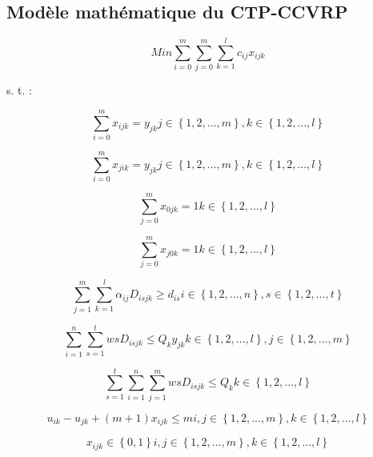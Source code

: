 \documentclass[12pt, a4paper, onecolumn, twoside,french,cleardoublepage=plain,openany]{article}
\begin{document}
\subsection{Modèle mathématique du CTP-CCVRP}\label{modele}
\begin{equation}
Min \sum_{i=0}^{m}\sum_{j=0}^{m}\sum_{k=1}^{l}c_{ij}x_{ijk}
\end{equation}

s. t. :

\begin{equation}
\sum_{i=0}^{m}x_{ijk} = y_{jk}   j\in\left\{1,2,...,m\right\}, k\in\left\{1,2,...,l\right\}
\end{equation}

\begin{equation}
\sum_{i=0}^{m}x_{jik} = y_{jk}   j\in\left\{1,2,...,m\right\}, k\in\left\{1,2,...,l\right\}
\end{equation}

\begin{equation}
\sum_{j=0}^{m}x_{0jk} = 1   k\in\left\{1,2,...,l\right\}
\end{equation}

\begin{equation}
\sum_{j=0}^{m}x_{j0k} = 1   k\in\left\{1,2,...,l\right\}
\end{equation}

\begin{equation}
\sum_{j=1}^{m}\sum_{k=1}^{l}\alpha_{ij}D_{isjk} \geq d_{is}    i\in\left\{1,2,...,n\right\}, s\in\left\{1,2,...,t\right\}
\end{equation}

\begin{equation}
\sum_{i=1}^{n}\sum_{s=1}^{t}w{s}D_{isjk} \leq Q_{k}y_{jk}    k\in\left\{1,2,...,l\right\}, j\in\left\{1,2,...,m\right\}
\end{equation}

\begin{equation}
\sum_{s=1}^{t}\sum_{i=1}^{n}\sum_{j=1}^{m}w{s}D_{isjk} \leq Q_{k}    k\in\left\{1,2,...,l\right\}
\end{equation}

\begin{equation}
u_{ik} - u_{jk} + (m + 1)x_{ijk} \leq m   i,j\in\left\{1,2,...,m\right\}, k\in\left\{1,2,...,l\right\}
\end{equation}

\begin{equation}
x_{ijk} \in\left\{0,1\right\}   i,j\in\left\{1,2,...,m\right\}, k\in\left\{1,2,...,l\right\}
\end{equation}
\end{document}
